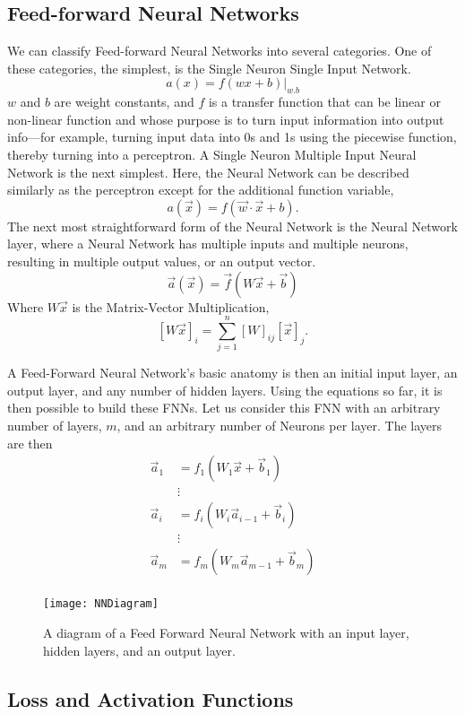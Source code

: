\subsection{Feed-forward Neural Networks}

We can classify Feed-forward Neural Networks into several categories. One of these categories, the simplest, is the Single Neuron Single Input Network. 
$$a(x)=f(wx + b)|_{w.b}$$
$w$ and $b$ are weight constants, and $f$ is a transfer function that can be linear or non-linear function and whose purpose is to turn input information into output info—for example, turning input data into 0s and 1s using the piecewise function, thereby turning into a perceptron. A Single Neuron Multiple Input Neural Network is the next simplest. Here, the Neural Network can be described similarly as the perceptron except for the additional function variable, $$a(\vec{x})=f(\vec{w}\cdot \vec{x}+b).$$ The next most straightforward form of the Neural Network is the Neural Network layer, where a Neural Network has multiple inputs and multiple neurons, resulting in multiple output values, or an output vector. 
$$\vec{a}(\vec{x})=\vec{f}(W\vec{x}+\vec{b})$$ Where $W\vec{x}$ is the Matrix-Vector Multiplication, $$[W\vec{x}]_i=\sum_{j=1}^n [W]_{ij}[\vec{x}]_{j}.$$ 

A Feed-Forward Neural Network's basic anatomy is then an initial input layer, an output layer, and any number of hidden layers. Using the equations so far, it is then possible to build these FNNs. Let us consider this FNN with an arbitrary number of layers, $m$, and an arbitrary number of Neurons per layer. The layers are then 
\begin{align*}
\vec{a}_1 &= f_1(W_1\vec{x} +\vec{b}_1 )\\
&\vdots\\
\vec{a}_i &= f_i(W_i\vec{a}_{i-1}+\vec{b}_i)\\
&\vdots\\
\vec{a}_m &= f_m(W_m\vec{a}_{m-1}+\vec{b}_m)\\
\end{align*}

\begin{figure}
	\centering
	\texttt{[image: NNDiagram]}
	\caption{A diagram of a Feed Forward Neural Network with an input layer, hidden layers, and an output layer.}
	\label{fig:NNDiagram}
\end{figure}

\subsection{Loss and Activation Functions}


